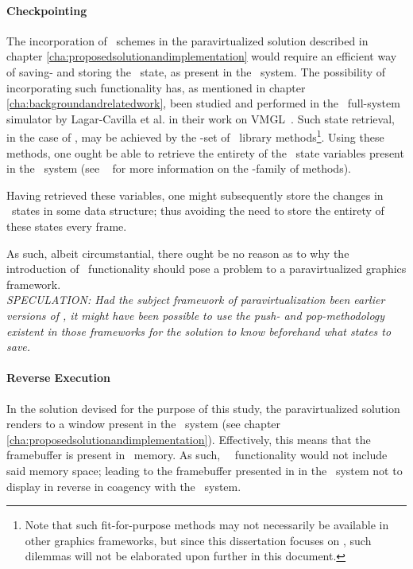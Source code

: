 \paragraph{Checkpointing}
\label{par:discussion_checkpointing}
The incorporation of \dvttermcheckpointrestart\ schemes in the paravirtualized solution described in chapter \ref{cha:proposedsolutionandimplementation} would require an efficient way of saving- and storing the \dvttermopengl\ state, as present in the \dvttermhost\ system.
The possibility of incorporating such functionality has, as mentioned in chapter \ref{cha:backgroundandrelatedwork}, been studied and performed in the \dvttermqemu\ full-system simulator by Lagar-Cavilla et al. in their work on VMGL~.
Such state retrieval, in the case of \dvttermopenglestwopointo , may be achieved by the -set of \dvttermopengl\ library methods\footnote{Note that such fit-for-purpose methods may not necessarily be available in other graphics frameworks, but since this dissertation focuses on \dvttermopenglestwopointo , such dilemmas will not be elaborated upon further in this document.}.
Using these methods, one ought be able to retrieve the entirety of the \dvttermopengl\ state variables present in the \dvttermhost\ system (see ~ for more information on the -family of methods).

Having retrieved these variables, one might subsequently store the changes in \dvttermopengl\ states in some data structure; thus avoiding the need to store the entirety of these states every frame.

As such, albeit circumstantial, there ought be no reason as to why the introduction of \dvttermcheckpoint\ functionality should pose a problem to a paravirtualized graphics framework.\\

\textit{SPECULATION: Had the subject framework of paravirtualization been earlier versions of \dvttermopengl , it might have been possible to use the push- and pop-methodology existent in those frameworks for the solution to know beforehand what states to save.}

\paragraph{Reverse Execution}
\label{par:discussion_reverseexecution}
In the solution devised for the purpose of this study, the paravirtualized solution renders to a window present in the \dvttermhost\ system (see chapter \ref{cha:proposedsolutionandimplementation}).
Effectively, this means that the framebuffer is present in \dvttermhost\ memory.
As such, \dvttermsimics\ \dvttermreverseexecution\ functionality would not include said memory space; leading to the framebuffer presented in in the \dvttermhost\ system not to display in reverse in coagency with the  \dvttermtarget\ system.

